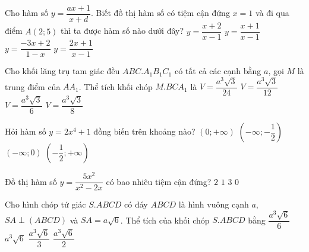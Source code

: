 \begin{ex}%
	Cho hàm số $y=\dfrac{ax+1}{x+d}$. Biết đồ thị hàm số có tiệm cận đứng $x = 1$ và đi qua điểm $ A(2;5)$ thì ta được hàm số nào dưới đây?
	\choice
	{$y=\dfrac{x+2}{x-1}$}
	{$y=\dfrac{x+1}{x-1}$}
	{$y=\dfrac{-3x+2}{1-x}$}
	{\True $y=\dfrac{2x+1}{x-1}$}
\end{ex}
\begin{ex}%
	Cho khối lăng trụ tam giác đều $ABC.A_1B_1C_1$ có tất cả các cạnh bằng $a$, gọi $M$ là trung điểm của $AA_1$. Thể tích khối chóp $M.BCA_1$ là
	\choice
	{\True $ V = \dfrac{a^3\sqrt 3}{24}$}
	{$ V = \dfrac{a^3\sqrt 3}{12}$}
	{$ V = \dfrac{a^3\sqrt 3}{6}$}
	{$ V = \dfrac{a^3\sqrt 3}{8}$}
\end{ex}
\begin{ex}%
	Hỏi hàm số $y =2x^4+1$ đồng biến trên khoảng nào?
	\choice
	{\True $ ({0;+\infty})$}
	{$\left(- \infty;-\dfrac{1}{2}\right)$}
	{$ ({- \infty;0})$}
	{$\left(-\dfrac{1}{2};+\infty\right)$}
\end{ex}
\begin{ex}%
	Đồ thị hàm số $y =\dfrac{5x^2}{x^2- 2x}$ có bao nhiêu tiệm cận đứng?
	\choice
	{$2$}
	{\True $1$}
	{$3$}
	{$0$}
\end{ex}

\begin{ex}%
	Cho hình chóp tứ giác $S.ABCD$ có đáy $ABCD$ là hình vuông cạnh $a$, $SA \perp (ABCD)$ và $SA=a\sqrt 6$. Thể tích của khối chóp $S.ABCD$ bằng
	\choice
	{$ \dfrac{a^3\sqrt 6}{6}$}
	{$a^3\sqrt 6$}
	{\True $\dfrac{a^3\sqrt 6}{3}$}
	{$ \dfrac{a^3\sqrt 6}{2}$}
\end{ex}

